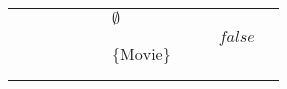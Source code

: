 \begin{table}[]
{\begin{tabular}{lllllllllll}
                          &                           &                   &                                                                          &                                                                        &                           & \cellcolor[HTML]{FC8D59}$\emptyset$                         &                                                                            &                                                                           &                                 &                                                                        \\
                          &                           &                   &                                                                          &                                                                        &                           &                                                             &                                                                            &                                                                           & \cellcolor[HTML]{FC8D59}$false$ &                                                                        \\
                          &                           &                   &                                                                          &                                                                        &                           & \cellcolor[HTML]{FC8D59}$\{\text{Movie}\}$                  &                                                                            &                                                                           &                                 &                                                                        \\
                          &                           &                   &                                                                          &                                                                        &                           &                                                             &                                                                            & \cellcolor[HTML]{FC8D59}  &                                 &                                                                        \\
                          &                           &                   &                                                                          &                                                                        &                           &                                                             &                                                                            &                                                                           &                                 & \cellcolor[HTML]{FC8D59}    \\

\end{tabular}}
\end{table}
